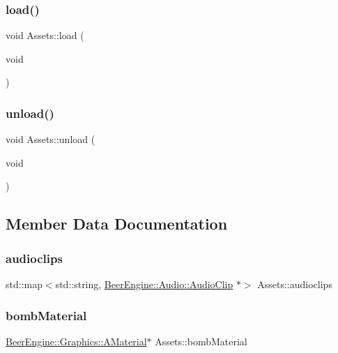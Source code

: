 \mbox{\label{class_assets_a39f25e7a1853ac52ca5fcfdb676ace04}} 
\subsubsection{\texorpdfstring{load()}{load()}}
{\footnotesize\ttfamily void Assets\+::load (\begin{DoxyParamCaption}\item[{void}]{ }\end{DoxyParamCaption})}

\mbox{\label{class_assets_a7c382091adff219150cbd067d646fe16}} 
\subsubsection{\texorpdfstring{unload()}{unload()}}
{\footnotesize\ttfamily void Assets\+::unload (\begin{DoxyParamCaption}\item[{void}]{ }\end{DoxyParamCaption})}



\subsection{Member Data Documentation}
\mbox{\label{class_assets_a74f01d64e94c8e26e8187d189cd018dc}} 
\subsubsection{\texorpdfstring{audioclips}{audioclips}}
{\footnotesize\ttfamily std\+::map$<$std\+::string, \mbox{\hyperlink{class_beer_engine_1_1_audio_1_1_audio_clip}{Beer\+Engine\+::\+Audio\+::\+Audio\+Clip}} $\ast$$>$ Assets\+::audioclips}

\mbox{\label{class_assets_a3888adb2654159b9791da38233467632}} 
\subsubsection{\texorpdfstring{bomb\+Material}{bombMaterial}}
{\footnotesize\ttfamily \mbox{\hyperlink{class_beer_engine_1_1_graphics_1_1_a_material}{Beer\+Engine\+::\+Graphics\+::\+A\+Material}}$\ast$ Assets\+::bomb\+Material}

